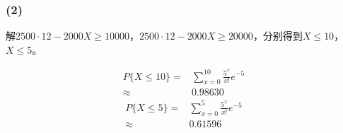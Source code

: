 \documentclass[a4paper,12pt]{ctexart}
\begin{document}
\subsubsection*{(2)}

解$2500 \cdot 12 - 2000X \geq 10000$，$2500 \cdot 12 - 2000X \geq 20000$，分别得到$X \leq 10$，$X \leq 5$。

\begin{align*}
	P\{X \leq 10\} =& \sum_{x = 0}^{10} \frac{5^x}{x!} e^{-5}\\
	\approx& 0.98630
\end{align*}
\begin{align*}
	P\{X \leq 5\} =& \sum_{x = 0}^{5} \frac{5^x}{x!} e^{-5}\\
	\approx& 0.61596
\end{align*}
\end{document}
